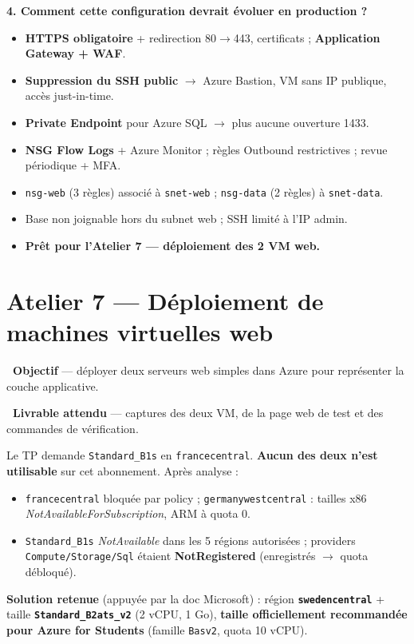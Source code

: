 \documentclass[11pt,a4paper]{article}
\newcommand{\emo}[1]{\raisebox{-0.14em}{\twemoji{#1}}}
\newcommand{\eTarget}{\emo{1f3af}}
\newcommand{\ePackage}{\emo{1f4e6}}
\newcommand{\arr}{\ensuremath{\rightarrow}}
\newcommand{\code}[1]{\texttt{#1}}
\begin{document}
\textbf{4. Comment cette configuration devrait évoluer en production ?}
\begin{itemize}
  \item \textbf{HTTPS obligatoire} + redirection 80\arr{}443, certificats ; \textbf{Application Gateway + WAF}.
  \item \textbf{Suppression du SSH public} \arr{} Azure Bastion, VM sans IP publique, accès just-in-time.
  \item \textbf{Private Endpoint} pour Azure SQL \arr{} plus aucune ouverture 1433.
  \item \textbf{NSG Flow Logs} + Azure Monitor ; règles Outbound restrictives ; revue périodique + MFA.
\end{itemize}

\begin{etatbox}
\begin{itemize}
  \item \code{nsg-web} (3 règles) associé à \code{snet-web} ; \code{nsg-data} (2 règles) à \code{snet-data}.
  \item Base non joignable hors du subnet web ; SSH limité à l'IP admin.
  \item \textbf{Prêt pour l'Atelier 7 — déploiement des 2 VM web.}
\end{itemize}
\end{etatbox}


\section{Atelier 7 — Déploiement de machines virtuelles web}

\begin{fiche}
\textbf{\eTarget~Objectif} — déployer deux serveurs web simples dans Azure pour représenter la couche applicative.

\textbf{\ePackage~Livrable attendu} — captures des deux VM, de la page web de test et des commandes de vérification.
\end{fiche}

\begin{notebox}
Le TP demande \code{Standard\_B1s} en \code{francecentral}. \textbf{Aucun des deux n'est utilisable} sur cet
abonnement. Après analyse :
\begin{itemize}
  \item \code{francecentral} bloquée par policy ; \code{germanywestcentral} : tailles x86 \textit{NotAvailableForSubscription}, ARM à quota 0.
  \item \code{Standard\_B1s} \textit{NotAvailable} dans les 5 régions autorisées ; providers \code{Compute/Storage/Sql} étaient \textbf{NotRegistered} (enregistrés \arr{} quota débloqué).
\end{itemize}
\textbf{Solution retenue} (appuyée par la doc Microsoft) : région \textbf{\code{swedencentral}} + taille
\textbf{\code{Standard\_B2ats\_v2}} (2 vCPU, 1 Go), \textbf{taille officiellement recommandée pour Azure for
Students} (famille \code{Basv2}, quota 10 vCPU).
\end{notebox}
\end{document}
